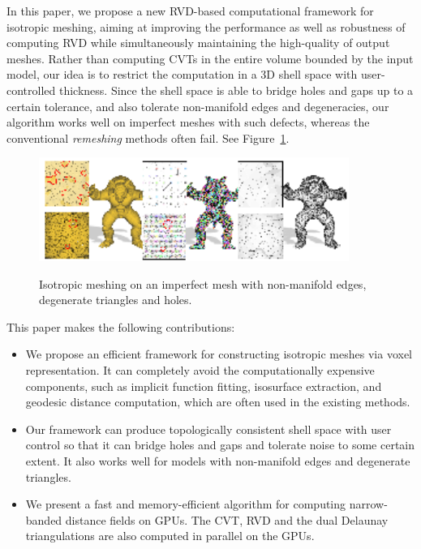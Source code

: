   In this paper, we propose a new RVD-based computational framework for isotropic meshing,
  aiming at improving the performance as well as robustness of computing RVD
  while simultaneously maintaining the high-quality of output meshes.
  Rather than computing CVTs in the entire volume bounded by the input model,
  our idea is to restrict the computation in a 3D shell space with user-controlled thickness.
  Since the shell space is able to bridge holes and gaps up to a certain tolerance,
  and also tolerate non-manifold edges and degeneracies, our algorithm works well on imperfect meshes with such defects,
  whereas the conventional \textit{remeshing} methods often fail. See Figure~\ref{fig:ami_broken}.

  \begin{figure}[thb]
  \centering
  \includegraphics[width=0.9\textwidth]{figs/gcvt/ami_broken}\\
  \begin{scriptsize}
    
  \end{scriptsize}
  \vspace{-0.1in}
  \caption{Isotropic meshing on an imperfect mesh with non-manifold edges, degenerate triangles and holes.}
  \label{fig:ami_broken}
  \end{figure}

  This paper makes the following contributions:
  \begin{itemize}
  \item We propose an efficient framework for constructing isotropic meshes via voxel representation.
  It can completely avoid the computationally expensive components,
  such as implicit function fitting, isosurface extraction, and geodesic distance computation, which are often used in the existing methods.
  \item Our framework can produce topologically consistent shell space with user control
  so that it can bridge holes and gaps and tolerate noise to some certain extent.
  It also works well for models with non-manifold edges and degenerate triangles.
  \item We present a fast and memory-efficient algorithm for computing narrow-banded distance fields on GPUs.
  The CVT, RVD and the dual Delaunay triangulations are also computed in parallel on the GPUs.
  \end{itemize}

